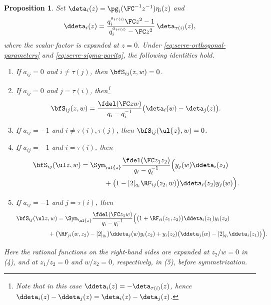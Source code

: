 \documentclass[reqno]{amsart}
\numberwithin{equation}{section}
\newtheorem*{proposition}{Proposition}
\begin{document}
\begin{proposition}\label{prop:serre-relations}
Set $\deta_i(z)=\pg_i(\FC^{-1}z^{-1})\eta_i(z)$ and
\begin{equation}\label{eq:serre-realized-cartan}
\ddeta_i(z)=
\frac{q_i^{a_{i\tau(i)}}\FC z^2-1}
  {q_i^{a_{i\tau(i)}}-\FC z^2}\,
\deta_{\tau(i)}(z),
\end{equation}
where the scalar factor is expanded at $z=0$.
Under \eqref{eq:serre-orthogonal-parameters} and
\eqref{eq:serre-sigma-parity}, the following identities hold.
\begin{enumerate}
\item If $a_{ij}=0$ and $i\neq\tau(j)$, then $\bfS_{ij}(z,w)=0$.
\item If $a_{ij}=0$ and $j=\tau(i)$, then\footnote{Note that in this case $\ddeta_i(z)=-\deta_{\tau(i)}(z)$, hence $\ddeta_i(z)-\ddeta_j(z)=\deta_i(z)-\deta_j(z)$.}
\begin{equation}\label{eq:serre-orthogonal-correction}
\bfS_{ij}(z,w)=\frac{\fdel(\FC zw)}{q_i-q_i^{-1}}
\bigl(\deta_i(w)-\deta_j(z)\bigr).
\end{equation}
\item If $a_{ij}=-1$ and $i\neq\tau(i),\tau(j)$, then
$\bfS_{ij}(\ul{z},w)=0$.
\item If $a_{ij}=-1$ and $i=\tau(i)$, then
\begin{equation}\label{eq:serre-fixed-minus-one-full}
\begin{aligned}
\bfS_{ij}(\ul z,w)
={}&
\Sym_{\ul{z}}\frac{\fdel(\FC z_1z_2)}{q_i-q_i^{-1}}\Bigl(
y_j(w)\ddeta_i(z_2)\\
&\qquad+
\bigl(1-[2]_{q_i}\RF_{ij}(z_2,w)\bigr)
\ddeta_i(z_2)y_j(w)\Bigr).
\end{aligned}
\end{equation}
\item If $a_{ij}=-1$ and $j=\tau(i)$, then
\begin{equation}\label{eq:serre-exchanged-minus-one-full}
\begin{aligned}
\bfS_{ij}(\ul z,w)
={}&\Sym_{\ul{z}}
\frac{\fdel(\FC z_1w)}{q_i-q_i^{-1}}\Bigl(
\bigl(1+\RF_{ii}(z_1,z_2)\bigr)
\ddeta_i(z_1)y_i(z_2)\\
&\hspace{-1cm}+
\bigl(\RF_{ji}(w,z_2)-[2]_{q_i}\bigr)
\ddeta_j(w)y_i(z_2)
	+y_i(z_2)\bigl(\ddeta_j(w)-[2]_{q_i}\ddeta_i(z_1)\bigr)
\Bigr).
\end{aligned}
\end{equation}
\end{enumerate}
Here the rational functions on the right-hand sides are expanded at
$z_2/w=0$ in (4), and at $z_1/z_2=0$ and $w/z_2=0$, respectively,
in (5), before symmetrization.
\end{proposition}
\end{document}
